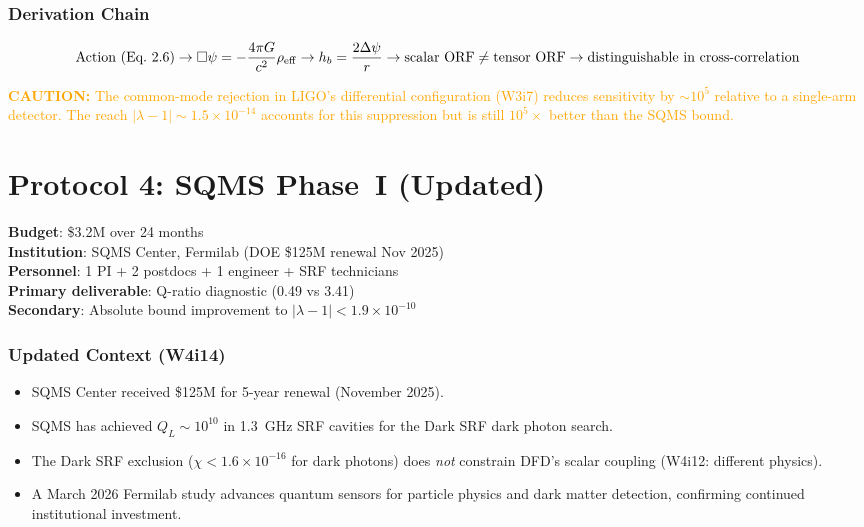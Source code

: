 \documentclass[11pt]{article}
\newcommand{\ee}[1]{\times 10^{#1}}
\newcommand{\lbone}{|\lambda - 1|}
\newcommand{\caution}[1]{\textcolor{orange}{\textbf{CAUTION:} #1}}
\begin{document}
\section{Derivation Chain}

\begin{equation}
\text{Action (Eq.~2.6)} \to
\Box\psi = -\frac{4\pi G}{c^2}\rho_{\rm eff} \to
h_b = \frac{2\Delta\psi}{r} \to
\text{scalar ORF} \neq \text{tensor ORF} \to
\text{distinguishable in cross-correlation}
\end{equation}

\caution{The common-mode rejection in LIGO's differential configuration
(W3i7) reduces sensitivity by $\sim 10^5$ relative to a single-arm
detector. The reach $\lbone \sim 1.5\ee{-14}$ accounts for this
suppression but is still $10^5\times$ better than the SQMS bound.}


\part{Protocol 4: SQMS Phase~I (Updated)}
\label{part:sqms}

\begin{tcolorbox}[colback=blue!3!white, colframe=proposalcolor,
  title=\textbf{PROTOCOL 4: SQMS PHASE I --- \$3.2M GATEWAY EXPERIMENT}]
\textbf{Budget}: \$3.2M over 24 months\\
\textbf{Institution}: SQMS Center, Fermilab (DOE \$125M renewal Nov 2025)\\
\textbf{Personnel}: 1 PI + 2 postdocs + 1 engineer + SRF technicians\\
\textbf{Primary deliverable}: Q-ratio diagnostic (0.49 vs 3.41)\\
\textbf{Secondary}: Absolute bound improvement to $\lbone < 1.9\ee{-10}$
\end{tcolorbox}

\section{Updated Context (W4i14)}

\begin{itemize}[nosep]
\item SQMS Center received \$125M for 5-year renewal (November 2025).
\item SQMS has achieved $Q_L \sim 10^{10}$ in 1.3~GHz SRF cavities
  for the Dark SRF dark photon search.
\item The Dark SRF exclusion ($\chi < 1.6\ee{-16}$ for dark photons)
  does \emph{not} constrain DFD's scalar coupling (W4i12: different physics).
\item A March 2026 Fermilab study advances quantum sensors for
  particle physics and dark matter detection, confirming continued
  institutional investment.
\end{itemize}
\end{document}
